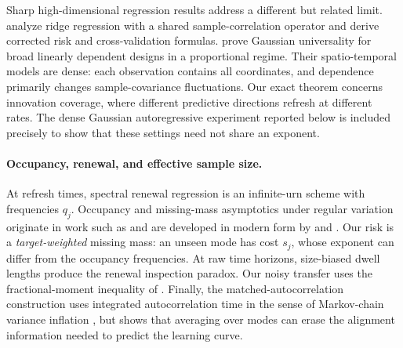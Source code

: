 Sharp high-dimensional regression results address a different but related
limit.  \citet{atanasov2025correlated} analyze ridge regression with a shared
sample-correlation operator and derive corrected risk and cross-validation
formulas.  \citet{moniri2025dependent} prove Gaussian universality for broad
linearly dependent designs in a proportional regime.  Their spatio-temporal
models are dense: each observation contains all coordinates, and dependence
primarily changes sample-covariance fluctuations.  Our exact theorem concerns
innovation coverage, where different predictive directions refresh at
different rates.  The dense Gaussian autoregressive experiment reported below is included
precisely to show that these settings need not share an exponent.

\paragraph{Occupancy, renewal, and effective sample size.}
At refresh times, spectral renewal regression is an infinite-urn scheme with
frequencies $q_j$.  Occupancy and missing-mass asymptotics under regular
variation originate in work such as \citet{karlin1968urn} and are developed in
modern form by \citet{gnedin2007occupancy} and
\citet{benhamou2017concentration}.  Our risk is a \emph{target-weighted}
missing mass: an unseen mode has cost $s_j$, whose exponent can differ from the
occupancy frequencies.  At raw time horizons, size-biased dwell lengths
produce the renewal inspection paradox.  Our noisy transfer uses the
fractional-moment inequality of \citet{vonbahr1965inequalities}.  Finally, the
matched-autocorrelation construction uses integrated autocorrelation time in
the sense of Markov-chain variance inflation \cite{geyer1992practical}, but
shows that averaging over modes can erase the alignment information needed to
predict the learning curve.
